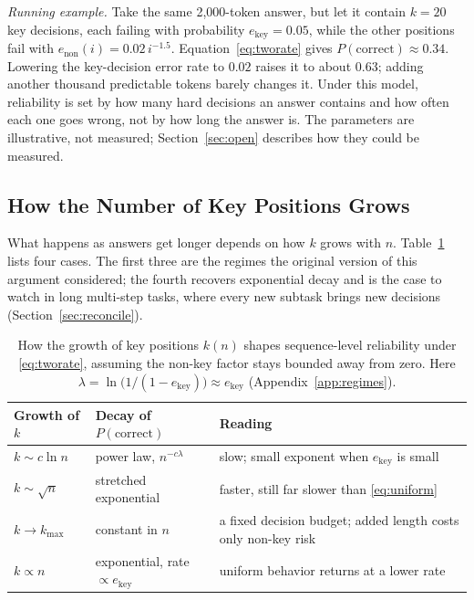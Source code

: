 \documentclass{ieeeaccess}
\begin{document}
\emph{Running example.} Take the same 2{,}000-token answer, but let it contain $k = 20$ key decisions, each failing with probability $e_{\text{key}} = 0.05$, while the other positions fail with $e_{\text{non}}(i) = 0.02\, i^{-1.5}$. Equation~\eqref{eq:tworate} gives $P(\text{correct}) \approx 0.34$. Lowering the key-decision error rate to $0.02$ raises it to about $0.63$; adding another thousand predictable tokens barely changes it. Under this model, reliability is set by how many hard decisions an answer contains and how often each one goes wrong, not by how long the answer is. The parameters are illustrative, not measured; Section~\ref{sec:open} describes how they could be measured.

\subsection{How the Number of Key Positions Grows}
What happens as answers get longer depends on how $k$ grows with $n$. Table~\ref{tab:regimes} lists four cases. The first three are the regimes the original version of this argument considered; the fourth recovers exponential decay and is the case to watch in long multi-step tasks, where every new subtask brings new decisions (Section~\ref{sec:reconcile}).

\begin{table}[!t]
\caption{How the growth of key positions $k(n)$ shapes sequence-level reliability under \eqref{eq:tworate}, assuming the non-key factor stays bounded away from zero. Here $\lambda = \ln\bigl(1/(1-e_{\text{key}})\bigr) \approx e_{\text{key}}$ (Appendix~\ref{app:regimes}).}
\label{tab:regimes}
\centering
\footnotesize
\renewcommand{\arraystretch}{1.15}
\begin{tabular}{@{}>{\raggedright\arraybackslash}p{1.65cm}>{\raggedright\arraybackslash}p{2.6cm}>{\raggedright\arraybackslash}p{3.4cm}@{}}
\toprule
\textbf{Growth of $k$} & \textbf{Decay of $P(\text{correct})$} & \textbf{Reading} \\
\midrule
$k \sim c\ln n$ & power law, $n^{-c\lambda}$ & slow; small exponent when $e_{\text{key}}$ is small \\
$k \sim \sqrt{n}$ & stretched exponential & faster, still far slower than \eqref{eq:uniform} \\
$k \to k_{\max}$ & constant in $n$ & a fixed decision budget; added length costs only non-key risk \\
$k \propto n$ & exponential, rate $\propto e_{\text{key}}$ & uniform behavior returns at a lower rate \\
\bottomrule
\end{tabular}
\end{table}
\end{document}
